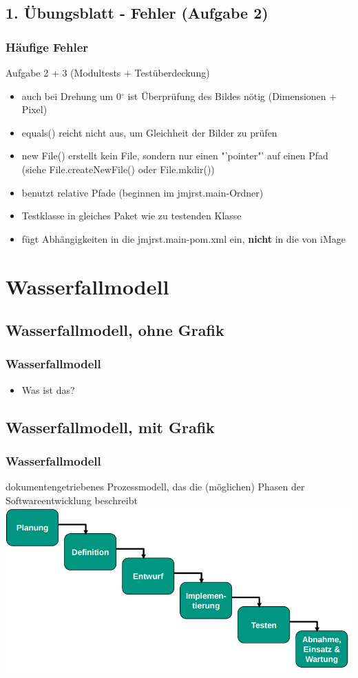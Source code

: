 \documentclass[18pt]{beamer}
\begin{document}
	\subsection{1. Übungsblatt - Fehler (Aufgabe 2)}
	\begin{frame}
		\frametitle{Häufige Fehler}
		\begin{block}{Aufgabe 2 + 3 (Modultests + Testüberdeckung)}
			\begin{itemize}
				\item auch bei Drehung um 0$^{\circ}$  ist Überprüfung des Bildes nötig (Dimensionen + Pixel) \pause
				\item equals() reicht nicht aus, um Gleichheit der Bilder zu prüfen \pause 
				\item new File() erstellt kein File, sondern nur einen "'pointer"' auf einen Pfad (siehe File.createNewFile() oder File.mkdir()) \pause
				\item benutzt relative Pfade (beginnen im jmjrst.main-Ordner) \pause 
				\item Testklasse in gleiches Paket wie zu testenden Klasse \pause 
				\item fügt Abhängigkeiten in die jmjrst.main-pom.xml ein, \textbf{nicht} in die von iMage 
			\end{itemize}
		\end{block}
	\end{frame}

\section{Wasserfallmodell}
	\subsection{Wasserfallmodell, ohne Grafik}
	\begin{frame}
		\frametitle{Wasserfallmodell}
		\begin{itemize}
			\item Was ist das? 
		\end{itemize}
	\end{frame}
	
	\subsection{Wasserfallmodell, mit Grafik}
	\begin{frame}
		\frametitle{Wasserfallmodell}
		dokumentengetriebenes Prozessmodell, das die (möglichen) Phasen der Softwareentwicklung beschreibt
		\includegraphics[scale=0.4]{./pics/tut1/waterfall_without-docs.png}
	\end{frame}
	
\end{document}
